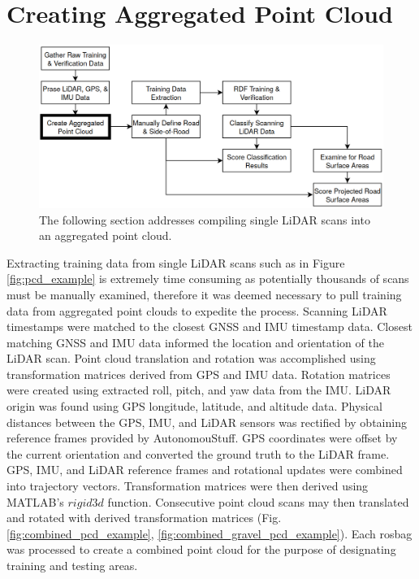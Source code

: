 \documentclass[numbered,pdftex]{ohio-etd}
\begin{document}
{{		
	} %
	
	\section{Creating Aggregated Point Cloud}\label{sec:create_aggregated_point_cloud}{
		
		\begin{figure}[H]
			\centering
			\includegraphics[width=0.9\linewidth]{Defense_Images/flowz_point_cloud}
			\caption[Aggregating Point Cloud Data Flowchart Context]{The following section addresses compiling single LiDAR scans into an aggregated point cloud.}
			\label{fig:flowz_point_cloud}
		\end{figure}
		
		{Extracting training data from single LiDAR scans such as in Figure \ref{fig:pcd_example} is extremely time consuming as potentially thousands of scans must be manually examined, therefore it was deemed necessary to pull training data from aggregated point clouds to expedite the process. Scanning LiDAR timestamps were matched to the closest GNSS and IMU timestamp data. Closest matching GNSS and IMU data informed the location and orientation of the LiDAR scan. Point cloud translation and rotation was accomplished using transformation matrices derived from GPS and IMU data. Rotation matrices were created using extracted roll, pitch, and yaw data from the IMU. LiDAR origin was found using GPS longitude, latitude, and altitude data. Physical distances between the GPS, IMU, and LiDAR sensors was rectified by obtaining reference frames provided by AutonomouStuff. GPS coordinates were offset by the current orientation and converted the ground truth to the LiDAR frame. GPS, IMU, and LiDAR reference frames and rotational updates were combined into trajectory vectors. Transformation matrices were then derived using MATLAB's $rigid3d$ function. Consecutive point cloud scans may then translated and rotated with derived transformation matrices (Fig. \ref{fig:combined_pcd_example}, \ref{fig:combined_gravel_pcd_example}). Each rosbag was processed to create a combined point cloud for the purpose of designating training and testing areas.}
		
}}
\end{document}
